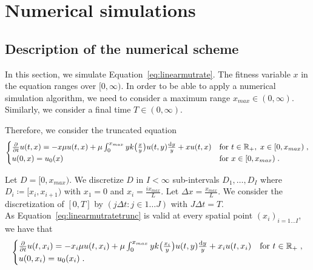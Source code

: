 \documentclass[11pt]{amsart}
\begin{document}
\appendix

\section{Numerical simulations}

\subsection{Description of the numerical scheme}
\label{s:num_schme}

In this section, we simulate Equation~\eqref{eq:linearmutrate}. The fitness variable $x$ in the equation ranges over $[0,\infty)$. In order to be able to apply a numerical simulation algorithm, we need to consider a maximum range $x_{max} \in (0,\infty)$. Similarly, we consider a final time $T \in (0,\infty)$.

Therefore, we consider the truncated equation
\begin{equation}
    \begin{cases}
	\frac{\partial}{\partial t}u(t,x) = - x\mu u(t,x) + \mu \int_{0}^{x_{max}} y k\big( \frac{x}{y}\big) u(t,y) \frac{\mathrm dy}{y} 
    + xu(t,x)
	& \text{for }t \in \mathbb{R}_+, \; x \in [0,x_{max}) \; ,
	\\
	u(0, x) = u_0(x)
	& \text{for } x \in [0,x_{max})
	\; .
    \end{cases}
    \label{eq:linearmutratetrunc}
\end{equation}

Let $D = [0, x_{max})$. We discretize $D$ in $I < \infty$ sub-intervals
$D_1, \ldots, D_I$ where $D_i \coloneqq [x_i, x_{i+1})$ with $x_1 = 0$ and $x_i = \frac{i x_{max}}{L}$. Let $\Delta x = \frac{x_{max}}{L}$. We consider the discretization of $[0,T]$ by $(j\Delta t : j \in 1\ldots J )$ with $J \Delta t = T$.\\ 

As Equation~\eqref{eq:linearmutratetrunc} is valid at every spatial point $(x_i)_{i = 1 \ldots I}$, we have that
\begin{equation}
    \begin{cases}
    \frac{\partial}{\partial t}u(t,x_i) = - x_i\mu u(t,x_i) + \mu \int_{0}^{x_{max}} y k\big( \frac{x_i}{y}\big) u(t,y) \frac{\mathrm dy}{y} + x_iu(t,x_i)
	& \text{for }t \in \mathbb{R}_+ \; ,
    \\
    u(0, x_i) = u_0(x_i)
    \; .
    \end{cases}
    \label{eq:linearmutratetruncMeshX}
\end{equation}
\end{document}

